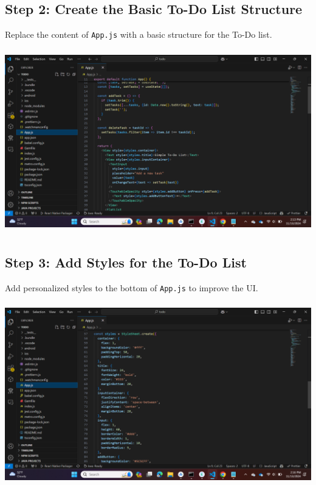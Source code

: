 \documentclass{article}
\begin{document}
    
\subsection*{Step 2: Create the Basic To-Do List Structure}

\begin{description}
Replace the content of \texttt{App.js} with a basic structure for the To-Do list.
\end{description}
\includegraphics[width=5.57813in,height=3.13391in]{media/image30.png}

\subsection*{Step 3: Add Styles for the To-Do List}

\begin{description}
Add personalized styles to the bottom of \texttt{App.js} to improve the UI.
\end{description}
\includegraphics[width=5.57813in,height=3.13391in]{media/image37.png}
\end{document}
